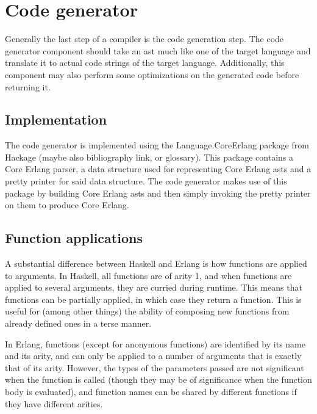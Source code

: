 \section{Code generator}



Generally the last step of a compiler is the code generation step. The code generator
component should take an \gls{ast} much like one of the target language and translate it
to actual code strings of the target language. Additionally, this component may also
perform some optimizations on the generated code before returning it.

\subsection{Implementation}

The code generator is implemented using the Language.CoreErlang \cite{CoreErlang} package
from Hackage (maybe also bibliography link, or glossary). This package contains a Core Erlang
parser, a data structure used for representing Core Erlang \gls{ast}s and a pretty printer for
said data structure. The code generator makes use of this package by building Core Erlang
\gls{ast}s and then simply invoking the pretty printer on them to  produce Core Erlang.

\subsection{Function applications}

A substantial difference between Haskell and Erlang is how functions are applied to arguments. 
In Haskell, all functions are of arity 1, and when functions are applied to several arguments, they are curried during runtime. This means that functions can be partially applied, in which case they return a function. This is useful for (among other things) the ability of composing new functions from already defined ones in a terse manner.

In Erlang, functions (except for anonymous functions) are identified by its name and its arity, and can only be applied to a number of arguments that is exactly that of its arity. However, the types of the parameters passed are not significant when the function is called (though they may be of significance when the function body is evaluated), and function names can be shared by different functions if they have different arities.

